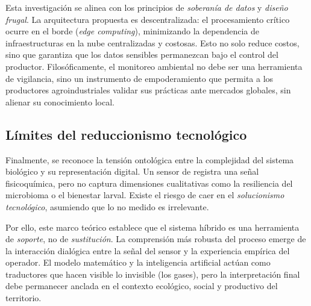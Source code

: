 Esta investigación se alinea con los principios de \textit{soberanía de datos} y \textit{diseño frugal}. La arquitectura propuesta es descentralizada: el procesamiento crítico ocurre en el borde (\textit{edge computing}), minimizando la dependencia de infraestructuras en la nube centralizadas y costosas. Esto no solo reduce costos, sino que garantiza que los datos sensibles permanezcan bajo el control del productor. Filosóficamente, el monitoreo ambiental no debe ser una herramienta de vigilancia, sino un instrumento de empoderamiento que permita a los productores agroindustriales validar sus prácticas ante mercados globales, sin alienar su conocimiento local.

\subsection{Límites del reduccionismo tecnológico}
Finalmente, se reconoce la tensión ontológica entre la complejidad del sistema biológico y su representación digital. Un sensor de  registra una señal fisicoquímica, pero no captura dimensiones cualitativas como la resiliencia del microbioma o el bienestar larval. Existe el riesgo de caer en el \textit{solucionismo tecnológico}, asumiendo que lo no medido es irrelevante.

Por ello, este marco teórico establece que el sistema híbrido es una herramienta de \textit{soporte}, no de \textit{sustitución}. La comprensión más robusta del proceso emerge de la interacción dialógica entre la señal del sensor y la experiencia empírica del operador. El modelo matemático y la inteligencia artificial actúan como traductores que hacen visible lo invisible (los gases), pero la interpretación final debe permanecer anclada en el contexto ecológico, social y productivo del territorio.